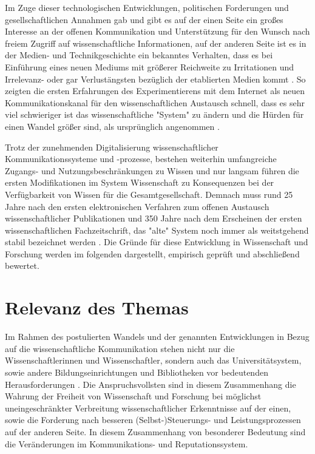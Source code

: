 Im Zuge dieser technologischen Entwicklungen, politischen Forderungen und gesellschaftlichen Annahmen gab und gibt es auf der einen Seite ein großes Interesse an der offenen Kommunikation und Unterstützung für den Wunsch nach freiem Zugriff auf wissenschaftliche Informationen, auf der anderen Seite ist es in der Medien- und Technikgeschichte ein bekanntes Verhalten, dass es bei Einführung eines neuen Mediums mit größerer Reichweite zu Irritationen \cite{naeder_2010_open} und Irrelevanz- oder gar Verlustängsten bezüglich der etablierten Medien kommt \cite{hagner_2015_sache_buches}. So zeigten die ersten Erfahrungen des Experimentierens mit dem Internet als neuen Kommunikationskanal für den wissenschaftlichen Austausch schnell, dass es sehr viel schwieriger ist das wissenschaftliche "System" zu ändern und die Hürden für einen Wandel größer sind, als ursprünglich angenommen \cite{bjork_2004_open}.

Trotz der zunehmenden Digitalisierung wissenschaftlicher Kommunikationssysteme und -prozesse, bestehen weiterhin umfangreiche Zugangs- und Nutzungsbeschränkungen zu Wissen und nur langsam führen die ersten Modifikationen im System Wissenschaft zu Konsequenzen bei der Verfügbarkeit von Wissen für die Gesamtgesellschaft. Demnach muss rund 25 Jahre nach den ersten elektronischen Verfahren zum offenen Austausch wissenschaftlicher Publikationen und 350 Jahre nach dem Erscheinen der ersten wissenschaftlichen Fachzeitschrift, das "alte" System noch immer als weitstgehend stabil bezeichnet werden \cite{Hanekop_2014}. Die Gründe für diese Entwicklung in Wissenschaft und Forschung werden im folgenden dargestellt, empirisch geprüft und abschließend bewertet.

\section{Relevanz des Themas}

Im Rahmen des postulierten Wandels und der genannten Entwicklungen in Bezug auf die wissenschaftliche Kommunikation stehen nicht nur die Wissenschaftlerinnen und Wissenschaftler, sondern auch das Universitätsystem, sowie andere Bildungseinrichtungen und Bibliotheken vor bedeutenden Herausforderungen \cite{muller_2010_open} \cite{Harter2006} \cite{Gu_don_2004} \cite{osterloh2008anreize} \cite{Beverungen_2014}. Die Anspruchsvollsten sind in diesem Zusammenhang die Wahrung der Freiheit von Wissenschaft und Forschung bei möglichst uneingeschränkter Verbreitung wissenschaftlicher Erkenntnisse \cite{hagner_2015_sache_buches} auf der einen, sowie die Forderung nach besseren (Selbst-)Steuerungs- und Leistungsprozessen \cite{Adler_2009} \cite{gibbons_1994} auf der anderen Seite. In diesem Zusammenhang von besonderer Bedeutung sind die Veränderungen im Kommunikations- und Reputationssystem.

